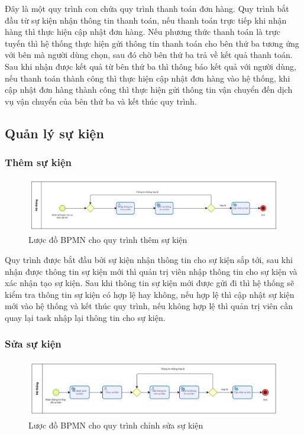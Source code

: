 Đây là một quy trình con chứa quy trình thanh toán đơn hàng. Quy trình bắt đầu từ sự kiện nhận thông tin thanh toán, nếu thanh toán trực tiếp khi nhận hàng thì thực hiện cập nhật đơn hàng. Nếu phương thức thanh toán là trực tuyến thì hệ thống thực hiện gửi thông tin thanh toán cho bên thứ ba tương ứng với bên mà người dùng chọn, sau đó chờ bên thứ ba trả về kết quả thanh toán. Sau khi nhận được kết quả từ bên thứ ba thì thông báo kết quả với người dùng, nếu thanh toán thành công thì thực hiện cập nhật đơn hàng vào hệ thống, khi cập nhật đơn hàng thành công thì thực hiện gửi thông tin vận chuyển đến dịch vụ vận chuyển của bên thứ ba và kết thúc quy trình.


\subsection{Quản lý sự kiện}

\subsubsection{Thêm sự kiện}

\begin{figure}[!htp]
	\centering
	\includegraphics[width=14cm]{img/BPMN/event/add_event.png}
	\newline
	\caption{Lược đồ BPMN cho quy trình thêm sự kiện}
\end{figure}

Quy trình được bắt đầu bởi sự kiện nhận thông tin cho sự kiện sắp tới, sau khi nhận được thông tin sự kiện mới thì quản trị viên nhập thông tin cho sự kiện và xác nhận tạo sự kiện. Sau khi thông tin sự kiện mới được gửi đi thì hệ thống sẽ kiểm tra thông tin sự kiện có hợp lệ hay không, nếu hợp lệ thì cập nhật sự kiện mới vào hệ thống và kết thúc quy trình, nếu không hợp lệ thì quản trị viên cần quay lại task nhập lại thông tin cho sự kiện.

\subsubsection{Sửa sự kiện}

\begin{figure}[!htp]
	\centering
	\includegraphics[width=14cm]{img/BPMN/event/edit_event.png}
	\newline
	\caption{Lược đồ BPMN cho quy trình chỉnh sửa sự kiện}
\end{figure}

